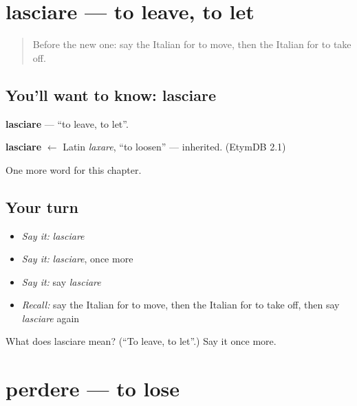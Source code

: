 \section[lasciare]{lasciare — to leave, to let}

\label{lesson:IT-C234-lasciare}



\begin{quote}
Before the new one: say the Italian for to move, then the Italian for to take off.
\end{quote}

\subsection*{You'll want to know: lasciare}
\textbf{lasciare} — \textquotedblleft{}to leave, to let\textquotedblright{}.

\begin{cousinweb}
\textbf{lasciare} $\leftarrow$ Latin \emph{laxare}, \textquotedblleft{}to loosen\textquotedblright{} — inherited. (EtymDB 2.1)
\end{cousinweb}

\begin{grammarlens}[title={What you've built}]
One more word for this chapter.
\end{grammarlens}

\subsection*{Your turn}
\begin{itemize}
\raggedright
  \item \emph{Say it:} \emph{lasciare}
  \item \emph{Say it:} \emph{lasciare}, once more
  \item \emph{Say it:} say \emph{lasciare}
  \item \emph{Recall:} say the Italian for to move, then the Italian for to take off, then say \emph{lasciare} again
\end{itemize}

\begin{tcolorbox}[breakable,colback=teal!4,colframe=teal!35!black,title={Before you move on}]
What does lasciare mean? (\textquotedblleft{}To leave, to let\textquotedblright{}.) Say it once more.
\end{tcolorbox}
\section[perdere]{perdere — to lose}

